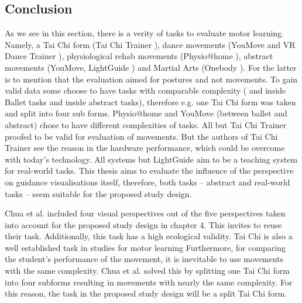 \subsection{Conclusion}
As we see in this section, there is a verity of tasks to evaluate motor learning. Namely, a Tai Chi form (Tai Chi Trainer \cite{Chua2003}), dance movements (YouMove \cite{Anderson2013a} and VR Dance Trainer \cite{Chan2010}), physiological rehab movements (Physio@home \cite{Tang2015}), abstract movements (YouMove, LightGuide \cite{Sodhi2012}) and Martial Arts (Onebody \cite{Hoang2016}). For the latter is to mention that the evaluation aimed for postures and not movements. To gain valid data some choose to have tasks with comparable complexity (\cite{Chua2003, Sodhi2012} and \cite{Anderson2013a} inside Ballet tasks and inside abstract tasks), therefore e.g. one Tai Chi form was taken and split into four sub forms. Physio@home and YouMove (between ballet and abstract) chose to have different complexities of tasks. All but Tai Chi Trainer proofed to be valid for evaluation of movements. But the authors of Tai Chi Trainer see the reason in the hardware performance, which could be overcome with today's technology. All systems but LightGuide aim to be a teaching system for real-world tasks. This thesis aims to evaluate the influence of the perspective on guidance visualisations itself, therefore, both tasks \--- abstract and real-world tasks \--- seem suitable for the proposed study design.
\begin{tcolorbox}[colback=red!30!white]
Chua et al. included four visual perspectives out of the five perspectives taken into account for the proposed study design in chapter 4. This invites to reuse their task. Additionally, this task has a high ecological validity. Tai Chi is also a well established task in studies for motor learning \cite{Komura2006, Anderson2013a, Han2017} Furthermore, for comparing the student's performance of the movement, it is inevitable to use movements with the same complexity. Chua et al. solved this by splitting one Tai Chi form into four subforms resulting in movements with nearly the same complexity. For this reason, the task in the proposed study design will be a split Tai Chi form. 
\end{tcolorbox}

\newpage
